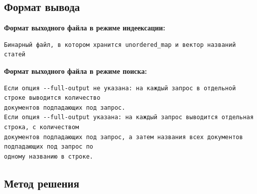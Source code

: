 \documentclass[12pt]{article}
\begin{document}
\subsection*{Формат вывода}

\textbf{Формат выходного файла в режиме индеексации:}
\begin{verbatim}
Бинарный файл, в котором хранится unordered_map и вектор названий статей
\end{verbatim}
\textbf{Формат выходного файла в режиме поиска:}
\begin{verbatim}
Если опция --full-output не указана: на каждый запрос в отдельной строке выводится количество
документов подпадающих под запрос.
Если опция --full-output указана: на каждый запрос выводится отдельная строка, с количеством
документов подпадающих под запрос, а затем названия всех документов подпадающих под запрос по
одному названию в строке.
\end{verbatim}

\subsection*{Метод решения}
\end{document}
